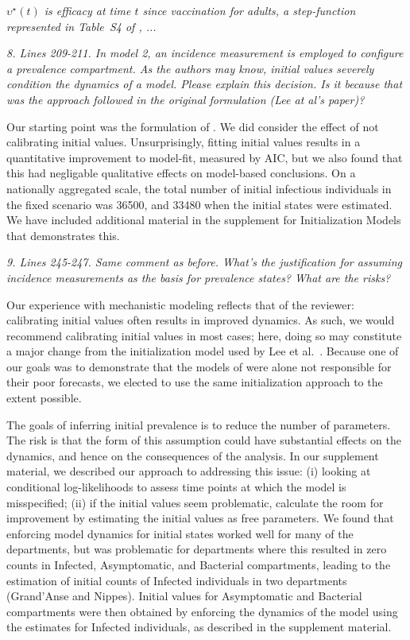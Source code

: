 \documentclass[11pt]{article}
\newcommand\report[1]{{\color{mygreen} \vspace{1mm}\hspace{0.25in}\parbox{6in}{\em #1}}}
\newcommand\article[1]{{\color{blue} \vspace{1mm}\hspace{0.25in}\parbox{6in}{\em #1}}}
\begin{document}
\article{$\upsilon^\star(t)$ is efficacy at time $t$ since vaccination for adults, a step-function represented in Table~S4 of \cite{lee20}, ...}

\report{
  8. Lines 209-211. In model 2, an incidence measurement is employed to configure a prevalence compartment. As the authors may know, initial values severely condition the dynamics of a model. Please explain this decision. Is it because that was the approach followed in the original formulation (Lee at al's paper)?
}

Our starting point was the formulation of \cite{lee20}.
We did consider the effect of not calibrating initial values.
Unsurprisingly, fitting initial values results in a quantitative improvement to model-fit, measured by AIC, but we also found that this had negligable qualitative effects on model-based conclusions.
On a nationally aggregated scale, the total number of initial infectious individuals in the fixed scenario was 36500, and 33480 when the initial states were estimated.
We have included additional material in the supplement for Initialization Models that demonstrates this.

\report{
  9. Lines 245-247. Same comment as before. What’s the justification for assuming incidence measurements as the basis for prevalence states? What are the risks?
}

Our experience with mechanistic modeling reflects that of the reviewer: calibrating initial values often results in improved dynamics.
As such, we would recommend calibrating initial values in most cases; here, doing so may constitute a major change from the initialization model used by Lee et al.~\cite{lee20}.
Because one of our goals was to demonstrate that the models of \cite{lee20} were alone not responsible for their poor forecasts, we elected to use the same initialization approach to the extent possible.

The goals of inferring initial prevalence is to reduce the number of parameters.
The risk is that the form of this assumption could have substantial effects on the dynamics, and hence on the consequences of the analysis.
In our supplement material, we described our approach to addressing this issue: (i) looking at conditional log-likelihoods to assess time points at which the model is misspecified; (ii) if the initial values seem problematic, calculate the room for improvement by estimating the initial values as free parameters.
We found that enforcing model dynamics for initial states worked well for many of the departments, but was problematic for departments where this resulted in zero counts in Infected, Asymptomatic, and Bacterial compartments, leading to the estimation of initial counts of Infected individuals in two departments (Grand'Anse and Nippes). Initial values for Asymptomatic and Bacterial compartments were then obtained by enforcing the dynamics of the model using the estimates for Infected individuals, as described in the supplement material.
\end{document}
